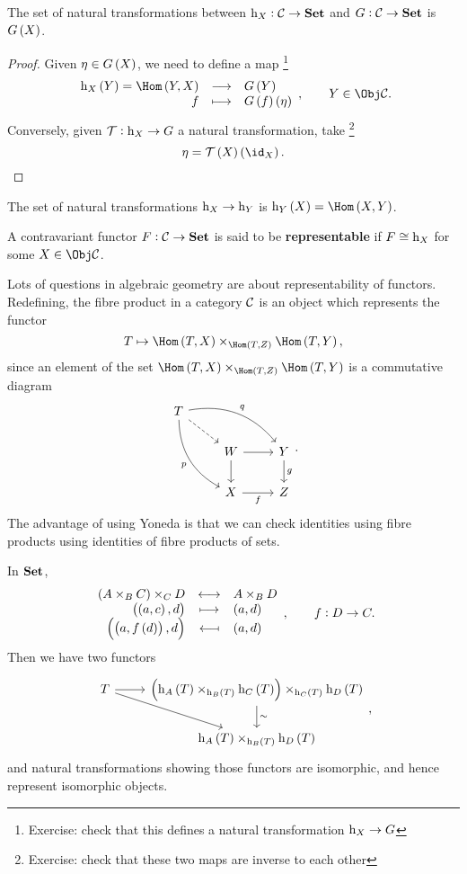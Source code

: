 \begin{lemma}
The set of natural transformations between $ \mathrm{h}_X : \mathcal{C} \to \textbf{Set} $ and $ G : \mathcal{C} \to \textbf{Set} $ is $ G\br{X} $.
\end{lemma}

\begin{proof}
Given $ \eta \in G\br{X} $, we need to define a map \footnote{Exercise: check that this defines a natural transformation $ \mathrm{h}_X \to G $}
$$ \function{\h_X\br{Y} = \Hom\br{Y, X}}{G\br{Y}}{f}{G\br{f}\br{\eta}}, \qquad Y \in \Obj \CCC. $$
Conversely, given $ \mathcal{T} : \mathrm{h}_X \to G $ a natural transformation, take \footnote{Exercise: check that these two maps are inverse to each other}
$$ \eta = \TTT\br{X}\br{\id_X}. $$
\end{proof}

\pagebreak

\begin{corollary}
The set of natural transformations $ \mathrm{h}_X \to \mathrm{h}_Y $ is $ \h_Y\br{X} = \Hom\br{X, Y} $.
\end{corollary}

\begin{definition*}
A contravariant functor $ F : \mathcal{C} \to \textbf{Set} $ is said to be \textbf{representable} if $ F \cong \mathrm{h}_X $ for some $ X \in \Obj \CCC $.
\end{definition*}

Lots of questions in algebraic geometry are about representability of functors. Redefining, the fibre product in a category $ \mathcal{C} $ is an object which represents the functor
$$ T \mapsto \Hom\br{T, X} \times_{\Hom\br{T, Z}} \Hom\br{T, Y}, $$
since an element of the set $ \Hom\br{T, X} \times_{\Hom\br{T, Z}} \Hom\br{T, Y} $ is a commutative diagram
$$
\begin{tikzcd}
T \arrow[dashed]{dr} \arrow[bend left=30]{drr}{q} \arrow[bend right=30]{ddr}[swap]{p} & & \\
& W \arrow{r} \arrow{d} & Y \arrow{d}{g} \\
& X \arrow{r}[swap]{f} & Z
\end{tikzcd}.
$$
The advantage of using Yoneda is that we can check identities using fibre products using identities of fibre products of sets.

\begin{example*}
In $ \textbf{Set} $,
$$ \bijection{\br{A \times_B C} \times_C D}{A \times_B D}{\br{\br{a, c}, d}}{\br{a, d}}{\br{\br{a, f\br{d}}, d}}{\br{a, d}}, \qquad f : D \to C. $$
Then we have two functors
$$
\begin{tikzcd}
T \arrow{r} \arrow{dr} & \br{\h_A\br{T} \times_{\h_B\br{T}} \h_C\br{T}} \times_{\h_C\br{T}} \h_D\br{T} \arrow{d}{\sim} \\
& \h_A\br{T} \times_{\h_B\br{T}} \h_D\br{T}
\end{tikzcd},
$$
and natural transformations showing those functors are isomorphic, and hence represent isomorphic objects.
\end{example*}

